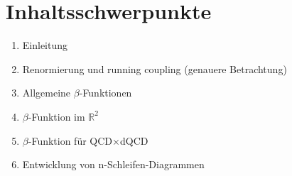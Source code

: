 








\section{Inhaltsschwerpunkte}
	\begin{enumerate}
		\item \label{part:Einleitung}	
			Einleitung
		\item \label{part:running_coupling}
			Renormierung und running coupling (genauere Betrachtung)
		\item \label{part:Betafunktion}
			Allgemeine $\beta$-Funktionen
		\item \label{part:Betafunktion im R2}
			$\beta$-Funktion im $\mathbb{R}^2$
		\item \label{part:Betafunktion fuer QCDxdQCD}
			$\beta$-Funktion für QCD$\times$dQCD
		\item \label{part:Diagramme}
			Entwicklung von n-Schleifen-Diagrammen
	\end{enumerate}







